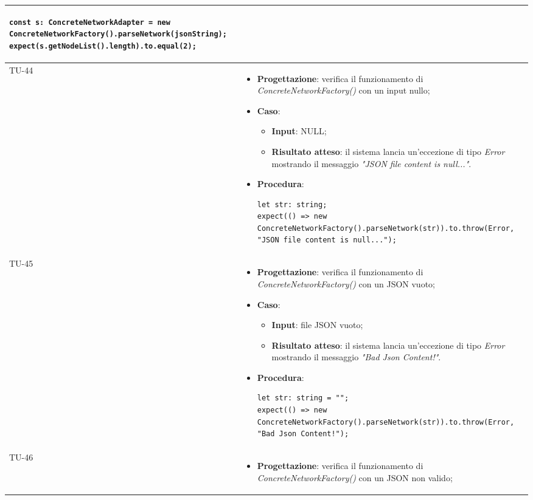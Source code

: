 \begin{longtable}{|C{1.5cm}|C{14.5cm}|}
\begin{itemize}
\begin{lstlisting}
const s: ConcreteNetworkAdapter = new ConcreteNetworkFactory().parseNetwork(jsonString);
expect(s.getNodeList().length).to.equal(2);
		\end{lstlisting}
	\end{itemize}\\
	\hline
	{TU-44} &
	\begin{itemize}
		\item \textbf{Progettazione}: verifica il funzionamento di \emph{ConcreteNetworkFactory()} con un input nullo;
		\item \textbf{Caso}: 
		\begin{itemize}
			\item \textbf{Input}: NULL;
			\item \textbf{Risultato atteso}: il sistema lancia un'eccezione di tipo \emph{Error} mostrando il messaggio \emph{"JSON file content is null..."}.
		\end{itemize}
		\item \textbf{Procedura}:
		\begin{lstlisting}
let str: string;
expect(() => new ConcreteNetworkFactory().parseNetwork(str)).to.throw(Error, "JSON file content is null...");
		\end{lstlisting}
	\end{itemize}\\
	\hline
	{TU-45} &
	\begin{itemize}
		\item \textbf{Progettazione}: verifica il funzionamento di \emph{ConcreteNetworkFactory()} con un JSON vuoto;
		\item \textbf{Caso}: 
		\begin{itemize}
			\item \textbf{Input}: file JSON vuoto;
			\item \textbf{Risultato atteso}: il sistema lancia un'eccezione di tipo \emph{Error} mostrando il messaggio \emph{"Bad Json Content!"}.
		\end{itemize}
		\item \textbf{Procedura}:
		\begin{lstlisting}
let str: string = "";
expect(() => new ConcreteNetworkFactory().parseNetwork(str)).to.throw(Error, "Bad Json Content!");
		\end{lstlisting}
	\end{itemize}\\
	\hline
	{TU-46} &
	\begin{itemize}
		\item \textbf{Progettazione}: verifica il funzionamento di \emph{ConcreteNetworkFactory()} con un JSON non valido;

\end{itemize}
\end{longtable}
